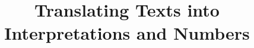 
\usepackage{tikz}
\usetikzlibrary{shapes,arrows}

\title{Translating Texts into Interpretations and Numbers}




\date[]{}



\frame{\titlepage}

\frame{\tableofcontents}


\frame{\tableofcontents[currentsection]}




\appendix
\frame{}


